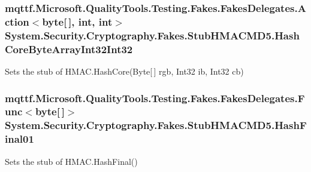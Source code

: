 \hypertarget{class_system_1_1_security_1_1_cryptography_1_1_fakes_1_1_stub_h_m_a_c_m_d5_ab0683c81ce409426cb153dd6a536a967}{
\subsubsection[{Hash\-Core\-Byte\-Array\-Int32\-Int32}]{\setlength{\rightskip}{0pt plus 5cm}mqttf.\-Microsoft.\-Quality\-Tools.\-Testing.\-Fakes.\-Fakes\-Delegates.\-Action$<$byte\mbox{[}$\,$\mbox{]}, int, int$>$ System.\-Security.\-Cryptography.\-Fakes.\-Stub\-H\-M\-A\-C\-M\-D5.\-Hash\-Core\-Byte\-Array\-Int32\-Int32}}\label{class_system_1_1_security_1_1_cryptography_1_1_fakes_1_1_stub_h_m_a_c_m_d5_ab0683c81ce409426cb153dd6a536a967}


Sets the stub of H\-M\-A\-C.\-Hash\-Core(\-Byte\mbox{[}$\,$\mbox{]} rgb, Int32 ib, Int32 cb)

\hypertarget{class_system_1_1_security_1_1_cryptography_1_1_fakes_1_1_stub_h_m_a_c_m_d5_ad21f9e5716a1aa771a87f023b1809d8f}{
\subsubsection[{Hash\-Final01}]{\setlength{\rightskip}{0pt plus 5cm}mqttf.\-Microsoft.\-Quality\-Tools.\-Testing.\-Fakes.\-Fakes\-Delegates.\-Func$<$byte\mbox{[}$\,$\mbox{]}$>$ System.\-Security.\-Cryptography.\-Fakes.\-Stub\-H\-M\-A\-C\-M\-D5.\-Hash\-Final01}}\label{class_system_1_1_security_1_1_cryptography_1_1_fakes_1_1_stub_h_m_a_c_m_d5_ad21f9e5716a1aa771a87f023b1809d8f}


Sets the stub of H\-M\-A\-C.\-Hash\-Final()

